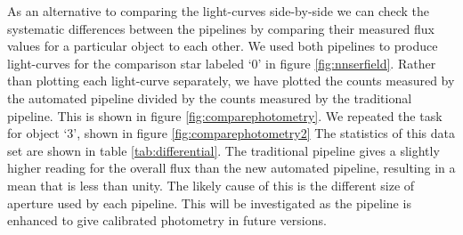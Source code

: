 

As an alternative to comparing the light-curves side-by-side we can check the systematic differences between the pipelines by comparing their measured flux values for a particular object to each other. We used both pipelines to produce light-curves for the comparison star labeled `0' in figure \ref{fig:nnserfield}. Rather than plotting each light-curve separately, we have plotted the counts measured by the automated pipeline divided by the counts measured by the traditional pipeline. This is shown in figure \ref{fig:comparephotometry}. We repeated the task for object `3', shown in figure \ref{fig:comparephotometry2} The statistics of this data set are shown in table \ref{tab:differential}. The traditional pipeline gives a slightly higher reading for the overall flux than the new automated pipeline, resulting in a mean that is less than unity. The likely cause of this is the different size of aperture used by each pipeline. This will be investigated as the pipeline is enhanced to give calibrated photometry in future versions. 

